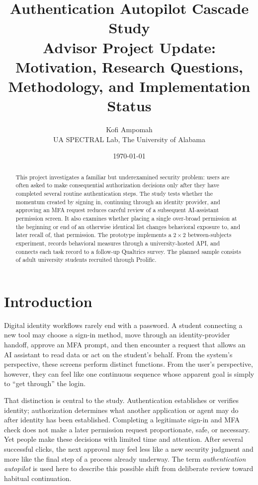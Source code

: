 \documentclass[11pt]{article}
\title{\textbf{Authentication Autopilot Cascade Study}\\
\large Advisor Project Update: Motivation, Research Questions, Methodology,
and Implementation Status}
\author{Kofi Ampomah\\UA SPECTRAL Lab, The University of Alabama}
\date{\today}
\begin{document}
\maketitle

\begin{abstract}
This project investigates a familiar but underexamined security problem: users
are often asked to make consequential authorization decisions only after they
have completed several routine authentication steps. The study tests whether
the momentum created by signing in, continuing through an identity provider,
and approving an MFA request reduces careful review of a subsequent
AI-assistant permission screen. It also examines whether placing a single
over-broad permission at the beginning or end of an otherwise identical list
changes behavioral exposure to, and later recall of, that permission. The
prototype implements a $2 \times 2$ between-subjects experiment, records
behavioral measures through a university-hosted API, and connects each task record to a follow-up
Qualtrics survey. The planned sample consists of adult university students
recruited through Prolific.
\end{abstract}

\section{Introduction}

Digital identity workflows rarely end with a password. A student connecting a
new tool may choose a sign-in method, move through an identity-provider
handoff, approve an MFA prompt, and then encounter a request that allows an AI
assistant to read data or act on the student's behalf. From the system's
perspective, these screens perform distinct functions. From the user's
perspective, however, they can feel like one continuous sequence whose apparent
goal is simply to ``get through'' the login.

That distinction is central to the study. Authentication establishes or
verifies identity; authorization determines what another application or agent
may do after identity has been established. Completing a legitimate sign-in
and MFA check does not make a later permission request proportionate, safe, or
necessary. Yet people make these decisions with limited time and attention.
After several successful clicks, the next approval may feel less like a new
security judgment and more like the final step of a process already underway.
The term \emph{authentication autopilot} is used here to describe this possible
shift from deliberate review toward habitual continuation.
\end{document}
